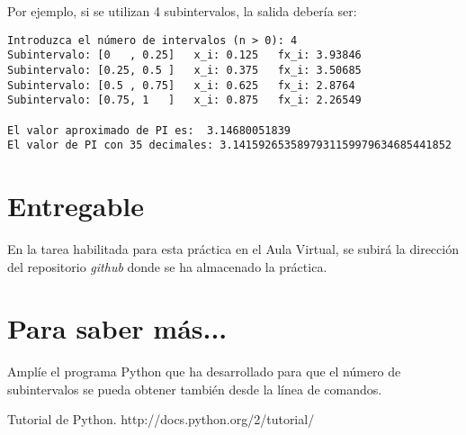\documentclass[spanish,a4paper,10pt]{article}
\begin{document}
Por ejemplo, si se utilizan 4 subintervalos, la salida debería ser: 

\begin{footnotesize}
\begin{verbatim}
Introduzca el número de intervalos (n > 0): 4
Subintervalo: [0   , 0.25]   x_i: 0.125   fx_i: 3.93846
Subintervalo: [0.25, 0.5 ]   x_i: 0.375   fx_i: 3.50685
Subintervalo: [0.5 , 0.75]   x_i: 0.625   fx_i: 2.8764
Subintervalo: [0.75, 1   ]   x_i: 0.875   fx_i: 2.26549

El valor aproximado de PI es:  3.14680051839 
El valor de PI con 35 decimales: 3.1415926535897931159979634685441852 \end{verbatim}
\end{footnotesize}

\section{Entregable}
En la tarea habilitada para esta práctica en el Aula Virtual, se subirá 
la dirección del repositorio \textit{github} donde se ha almacenado la práctica. 

\section{Para saber más...}

Amplíe el programa \textsf{Python} que ha desarrollado para que el número de
subintervalos se pueda obtener también desde la línea de comandos.

\begin{thebibliography}{1}
 Tutorial de Python. http://docs.python.org/2/tutorial/ 
\end{thebibliography}
\end{document}
